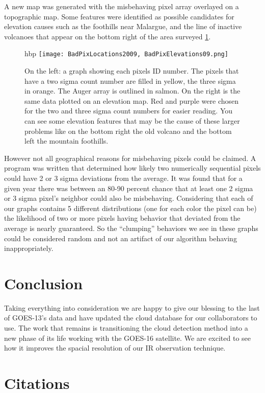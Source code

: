 \documentclass{article}
\begin{document}
A new map was generated with the misbehaving pixel array overlayed on a
topographic map. Some features were identified as possible candidates for
elevation causes such as the foothills near Malargue, and the line of inactive
volcanoes that appear on the bottom right of the area surveyed
\ref{fig:Elevation09}. 

\begin{figure}{hbp}
\texttt{[image: BadPixLocations2009,
BadPixElevations09.png]} 
  \caption{On the left:  a graph showing each pixels ID
number. The pixels that have a two sigma count number are filled in yellow, the
three sigma in orange. The Auger array is outlined in salmon. On the right is
the same data plotted on an elevation map. Red and purple were chosen for the
two and three sigma count numbers for easier reading. You can see some
elevation features that may be the cause of these larger problems like on the
bottom right the old volcano and the bottom left the mountain foothills.}
 \label{fig:Elevation09}
\end{figure}

However not all geographical reasons for misbehaving pixels could be claimed. A
program was written that determined how likely two numerically sequential
pixels could have 2 or 3 sigma deviations from the average. It was found that
for a given year there was between an 80-90 percent chance that at least one 2
sigma or 3 sigma pixel’s neighbor could also be misbehaving. Considering that
each of our graphs contains 5 different distributions (one for each color the
pixel can be) the likelihood of two or more pixels having behavior that
deviated from the average is nearly guaranteed. So the “clumping” behaviors we
see in these graphs could be considered random and not an artifact of our
algorithm behaving inappropriately. 
  
\section{Conclusion}
Taking everything into consideration we are happy to give our blessing to the
last of GOES-13’s data and have updated the cloud database for our
collaborators to use. The work that remains is transitioning the cloud
detection method  into a new phase of its life working with the GOES-16
satellite. We are excited to see how it improves the spacial resolution of our
IR observation technique. 
\section{Citations}
 
\end{document}
